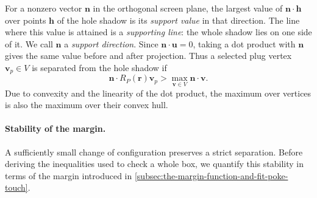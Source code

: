 For a nonzero vector $\mathbf n$ in the orthogonal screen plane, the largest
value of $\mathbf n\cdot\mathbf h$ over points $\mathbf h$ of the hole shadow
is its \emph{support value}
in that direction. The line where this value is attained is a
\emph{supporting line}: the whole shadow lies on one side of it.
We call $\mathbf n$ a \emph{support direction}. Since
$\mathbf n\cdot\mathbf u=0$, taking a dot product with $\mathbf n$ gives
the same value before and after projection. Thus a selected plug vertex
$\mathbf v_p\in V$ is separated from the hole shadow if
\begin{equation}\label{eq:point-support-separation}
  \mathbf n\cdot R_P(\mathbf r)\mathbf v_p
     >\max_{\mathbf v\in V}\mathbf n\cdot\mathbf v.
\end{equation}
Due to convexity and the linearity of the dot product, the maximum over
vertices is also the maximum over their convex hull.

\paragraph{Stability of the margin.}
A sufficiently small change of configuration preserves a strict
separation. Before deriving the inequalities used to check a whole box,
we quantify this stability in terms of the margin introduced in
\cref{subsec:the-margin-function-and-fit-poke-touch}.


